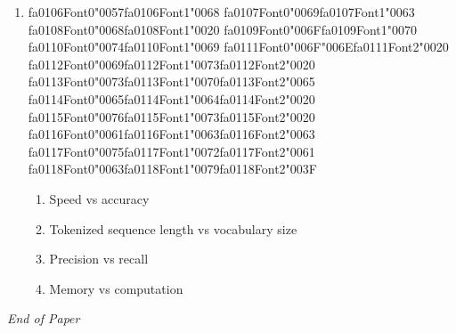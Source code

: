 \documentclass[12pt]{article}
\begin{document}
\begin{enumerate}[label=Q\arabic*.]
\item {\csname fa0106Font0\endcsname\char"0057}{\csname fa0106Font1\endcsname\char"0068} {\csname fa0107Font0\endcsname\char"0069}{\csname fa0107Font1\endcsname\char"0063} {\csname fa0108Font0\endcsname\char"0068}{\csname fa0108Font1\endcsname\char"0020} {\csname fa0109Font0\endcsname\char"006F}{\csname fa0109Font1\endcsname\char"0070} {\csname fa0110Font0\endcsname\char"0074}{\csname fa0110Font1\endcsname\char"0069} {\csname fa0111Font0\endcsname\char"006F}{\char"006E}{\csname fa0111Font2\endcsname\char"0020} {\csname fa0112Font0\endcsname\char"0069}{\csname fa0112Font1\endcsname\char"0073}{\csname fa0112Font2\endcsname\char"0020} {\csname fa0113Font0\endcsname\char"0073}{\csname fa0113Font1\endcsname\char"0070}{\csname fa0113Font2\endcsname\char"0065} {\csname fa0114Font0\endcsname\char"0065}{\csname fa0114Font1\endcsname\char"0064}{\csname fa0114Font2\endcsname\char"0020} {\csname fa0115Font0\endcsname\char"0076}{\csname fa0115Font1\endcsname\char"0073}{\csname fa0115Font2\endcsname\char"0020} {\csname fa0116Font0\endcsname\char"0061}{\csname fa0116Font1\endcsname\char"0063}{\csname fa0116Font2\endcsname\char"0063} {\csname fa0117Font0\endcsname\char"0075}{\csname fa0117Font1\endcsname\char"0072}{\csname fa0117Font2\endcsname\char"0061} {\csname fa0118Font0\endcsname\char"0063}{\csname fa0118Font1\endcsname\char"0079}{\csname fa0118Font2\endcsname\char"003F}
\begin{enumerate}[label=(\Alph*)]
    \item Speed vs accuracy
    \item Tokenized sequence length vs vocabulary size
    \item Precision vs recall
    \item Memory vs computation
\end{enumerate}
\end{enumerate}

\vfill
\noindent\textit{End of Paper}
\end{document}
